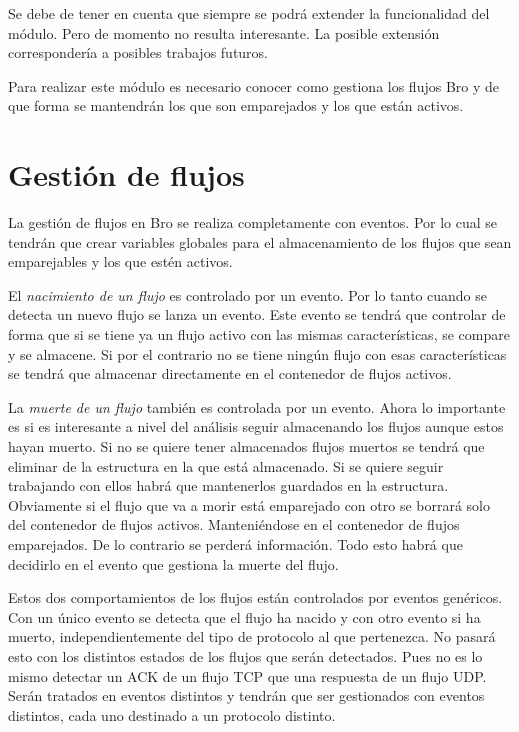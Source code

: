 \intro Se debe de tener en cuenta que siempre se podrá extender la funcionalidad del módulo. Pero de momento no 
resulta interesante. La posible extensión correspondería a posibles trabajos futuros.

\intro Para realizar este módulo es necesario conocer como gestiona los flujos Bro y de que forma se mantendrán 
los que son emparejados y los que están activos.

\section{Gestión de flujos}

La gestión de flujos en Bro se realiza completamente con eventos. Por lo cual se tendrán que crear variables 
globales para el almacenamiento de los flujos que sean emparejables y los que estén activos.

\intro El \textit{nacimiento de un flujo} es controlado por un evento. Por lo tanto cuando se detecta un nuevo 
flujo se lanza un evento. Este evento se tendrá que controlar de forma que si se tiene ya un flujo activo con las 
mismas características, se compare y se almacene. Si por el contrario no se tiene ningún flujo con esas 
características se tendrá que almacenar directamente en el contenedor de flujos activos.

\intro La \textit{muerte de un flujo} también es controlada por un evento. Ahora lo importante es si es interesante 
a nivel del análisis seguir almacenando los flujos aunque estos hayan muerto. Si no se quiere tener almacenados 
flujos muertos se tendrá que eliminar de la estructura en la que está almacenado. Si se quiere seguir trabajando 
con ellos habrá que mantenerlos guardados en la estructura. Obviamente si el flujo que va a morir está emparejado 
con otro se borrará solo del contenedor de flujos activos. Manteniéndose en el contenedor de flujos emparejados. De 
lo contrario se perderá información. Todo esto habrá que decidirlo en el evento que gestiona la muerte del flujo.

\intro Estos dos comportamientos de los flujos están controlados por eventos genéricos. Con un único evento se 
detecta que el flujo ha nacido y con otro evento si ha muerto, independientemente del tipo de protocolo al que 
pertenezca. No pasará esto con los distintos estados de los flujos que serán detectados. Pues no es lo mismo 
detectar un ACK de un flujo TCP que una respuesta de un flujo UDP. Serán tratados en eventos distintos y tendrán que ser gestionados con eventos distintos, cada uno destinado a un protocolo distinto. 

